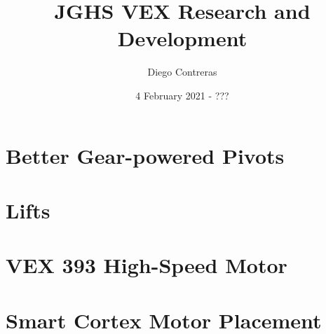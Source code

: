 \documentclass[12pt]{article}
\title{JGHS VEX Research and Development}
\author{Diego Contreras}
\date{4 February 2021 - ???}
\begin{document}
\maketitle
\newpage
\tableofcontents















\section{Better Gear-powered Pivots}
\section{Lifts}
\section{VEX 393 High-Speed Motor}
\section{Smart Cortex Motor Placement}



\end{document}
